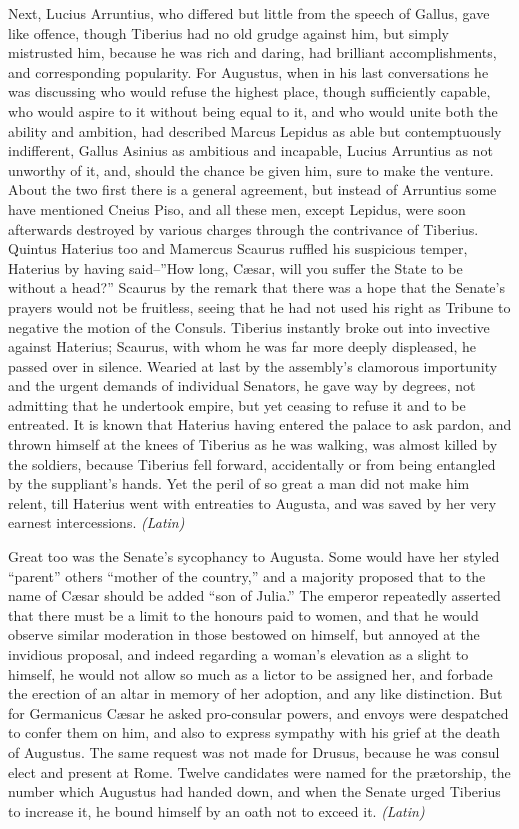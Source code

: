 
Next, Lucius Arruntius, who differed but little from the speech of Gallus, gave like offence, though Tiberius had no old grudge against him, but simply mistrusted him, because he was rich and daring, had brilliant accomplishments, and corresponding popularity. For Augustus, when in his last conversations he was discussing who would refuse the highest place, though sufficiently capable, who would aspire to it without being equal to it, and who would unite both the ability and ambition, had described Marcus Lepidus as able but contemptuously indifferent, Gallus Asinius as ambitious and incapable, Lucius Arruntius as not unworthy of it, and, should the chance be given him, sure to make the venture. About the two first there is a general agreement, but instead of Arruntius some have mentioned Cneius Piso, and all these men, except Lepidus, were soon afterwards destroyed by various charges through the contrivance of Tiberius. Quintus Haterius too and Mamercus Scaurus ruffled his suspicious temper, Haterius by having said--''How long, Cæsar, will you suffer the State to be without a head?'' Scaurus by the remark that there was a hope that the Senate's prayers would not be fruitless, seeing that he had not used his right as Tribune to negative the motion of the Consuls. Tiberius instantly broke out into invective against Haterius; Scaurus, with whom he was far more deeply displeased, he passed over in silence. Wearied at last by the assembly's clamorous importunity and the urgent demands of individual Senators, he gave way by degrees, not admitting that he undertook empire, but yet ceasing to refuse it and to be entreated. It is known that Haterius having entered the palace to ask pardon, and thrown himself at the knees of Tiberius as he was walking, was almost killed by the soldiers, because Tiberius fell forward, accidentally or from being entangled by the suppliant's hands. Yet the peril of so great a man did not make him relent, till Haterius went with entreaties to Augusta, and was saved by her very earnest intercessions. \emph{(Latin)}


Great too was the Senate's sycophancy to Augusta. Some would have her styled ``parent'' others ``mother of the country,'' and a majority proposed that to the name of Cæsar should be added ``son of Julia.'' The emperor repeatedly asserted that there must be a limit to the honours paid to women, and that he would observe similar moderation in those bestowed on himself, but annoyed at the invidious proposal, and indeed regarding a woman's elevation as a slight to himself, he would not allow so much as a lictor to be assigned her, and forbade the erection of an altar in memory of her adoption, and any like distinction. But for Germanicus Cæsar he asked pro-consular powers, and envoys were despatched to confer them on him, and also to express sympathy with his grief at the death of Augustus. The same request was not made for Drusus, because he was consul elect and present at Rome. Twelve candidates were named for the prætorship, the number which Augustus had handed down, and when the Senate urged Tiberius to increase it, he bound himself by an oath not to exceed it. \emph{(Latin)}

